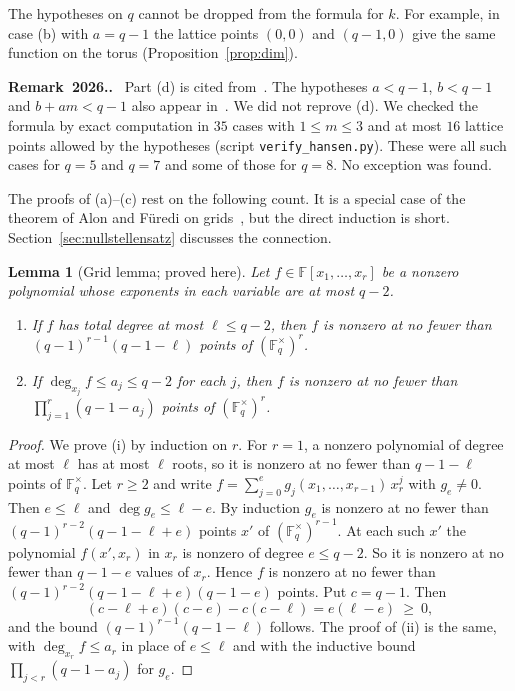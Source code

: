 \documentclass[12pt,letterpaper]{article}
\numberwithin{equation}{section}
\newtheorem{lemma}[theorem]{Lemma}
\theoremstyle{definition}
\theoremstyle{remark}
\newcounter{remxxvi}
\renewcommand{\theremxxvi}{2026.\arabic{remxxvi}}
\newenvironment{remarkxxvi}{\refstepcounter{remxxvi}\par\medskip\noindent
  \textbf{Remark~\theremxxvi.}\ }{\par\medskip}
\newcommand{\F}{\mathbb{F}}
\newcommand{\Fqs}{\mathbb{F}_q^{\times}}
\begin{document}
The hypotheses on $q$ cannot be dropped from the formula for $k$. For example,
in case (b) with $a=q-1$ the lattice points $(0,0)$ and $(q-1,0)$ give the same
function on the torus (Proposition~\ref{prop:dim}).

\begin{remarkxxvi}\label{rem:hansend}
Part (d) is cited from~\cite{Ha02}. The hypotheses $a<q-1$, $b<q-1$ and
$b+am<q-1$ also appear in~\cite[Thm.~1.4 ff.]{Ha04}. We did not reprove (d).
We checked the formula by exact computation in $35$ cases with $1\le m\le3$
and at most $16$ lattice points allowed by the hypotheses (script
\texttt{verify\_hansen.py}). These were all such cases for $q=5$ and $q=7$ and
some of those for $q=8$. No exception was found.
\end{remarkxxvi}

The proofs of (a)--(c) rest on the following count. It is a special case of
the theorem of Alon and F\"uredi on grids~\cite{AF93}, but the direct
induction is short. Section~\ref{sec:nullstellensatz} discusses the
connection.

\begin{lemma}[Grid lemma; proved here]\label{lem:grid}
Let $f\in\F[x_1,\dots,x_r]$ be a nonzero polynomial whose exponents in each
variable are at most $q-2$.
\begin{enumerate}[label=(\roman*)]
\item If $f$ has total degree at most $\ell\le q-2$, then $f$ is nonzero at no
fewer than $(q-1)^{r-1}(q-1-\ell)$ points of $(\Fqs)^r$.
\item If $\deg_{x_j}f\le a_j\le q-2$ for each $j$, then $f$ is nonzero at no
fewer than $\prod_{j=1}^r(q-1-a_j)$ points of $(\Fqs)^r$.
\end{enumerate}
\end{lemma}

\begin{proof}
We prove (i) by induction on $r$. For $r=1$, a nonzero polynomial of degree at
most $\ell$ has at most $\ell$ roots, so it is nonzero at no fewer than
$q-1-\ell$ points of $\Fqs$. Let $r\ge2$ and write
$f=\sum_{j=0}^{e}g_j(x_1,\dots,x_{r-1})\,x_r^j$ with $g_e\ne0$. Then $e\le\ell$
and $\deg g_e\le\ell-e$. By induction $g_e$ is nonzero at no fewer than
$(q-1)^{r-2}(q-1-\ell+e)$ points $x'$ of $(\Fqs)^{r-1}$. At each such $x'$ the
polynomial $f(x',x_r)$ in $x_r$ is nonzero of degree $e\le q-2$. So it is
nonzero at no fewer than $q-1-e$ values of $x_r$. Hence $f$ is nonzero at no
fewer than $(q-1)^{r-2}(q-1-\ell+e)(q-1-e)$ points. Put $c=q-1$. Then
\[
(c-\ell+e)(c-e)-c(c-\ell)=e(\ell-e)\ \ge\ 0,
\]
and the bound $(q-1)^{r-1}(q-1-\ell)$ follows. The proof of (ii) is the same,
with $\deg_{x_r}f\le a_r$ in place of $e\le\ell$ and with the inductive bound
$\prod_{j<r}(q-1-a_j)$ for $g_e$.
\end{proof}
\end{document}
